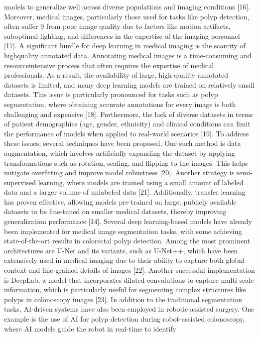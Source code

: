 models to generalize well across diverse populations and imaging conditions [16]. Moreover, medical images, particularly those used for tasks like polyp detection, often suffer
9
from poor image quality due to factors like motion artifacts, suboptimal lighting, and
differences in the expertise of the imaging personnel [17].
A significant hurdle for deep learning in medical imaging is the scarcity of highquality annotated data. Annotating medical images is a time-consuming and resourceintensive process that often requires the expertise of medical professionals. As a result, the
availability of large, high-quality annotated datasets is limited, and many deep learning
models are trained on relatively small datasets. This issue is particularly pronounced
for tasks such as polyp segmentation, where obtaining accurate annotations for every
image is both challenging and expensive [18]. Furthermore, the lack of diverse datasets
in terms of patient demographics (age, gender, ethnicity) and clinical conditions can limit
the performance of models when applied to real-world scenarios [19].
To address these issues, several techniques have been proposed. One such method is
data augmentation, which involves artificially expanding the dataset by applying transformations such as rotation, scaling, and flipping to the images. This helps mitigate overfitting
and improve model robustness [20]. Another strategy is semi-supervised learning, where
models are trained using a small amount of labeled data and a larger volume of unlabeled
data [21]. Additionally, transfer learning has proven effective, allowing models pre-trained
on large, publicly available datasets to be fine-tuned on smaller medical datasets, thereby
improving generalization performance [14].
Several deep learning-based models have already been implemented for medical
image segmentation tasks, with some achieving state-of-the-art results in colorectal polyp
detection. Among the most prominent architectures are U-Net and its variants, such as
U-Net++, which have been extensively used in medical imaging due to their ability to
capture both global context and fine-grained details of images [22]. Another successful
implementation is DeepLab, a model that incorporates dilated convolutions to capture
multi-scale information, which is particularly useful for segmenting complex structures like
polyps in colonoscopy images [23].
In addition to the traditional segmentation tasks, AI-driven systems have also been
employed in robotic-assisted surgery. One example is the use of AI for polyp detection
during robot-assisted colonoscopy, where AI models guide the robot in real-time to identify
